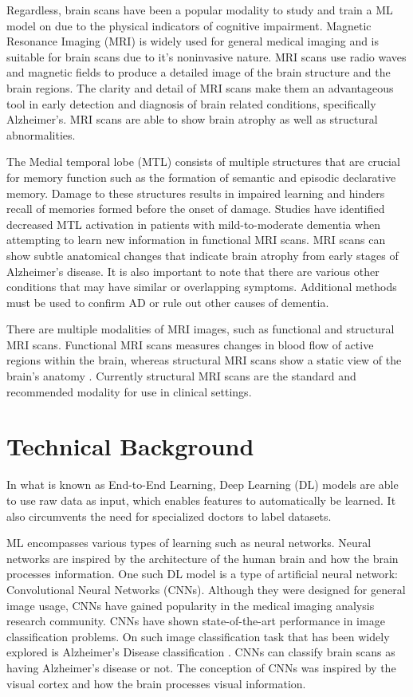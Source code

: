 \documentclass[10pt,twocolumn]{article}
\begin{document}
Regardless, brain scans have been a popular modality to study and train a ML model on due to the physical indicators of cognitive impairment. Magnetic Resonance Imaging (MRI) is widely used for general medical imaging and is suitable for brain scans due to it's noninvasive nature. MRI scans use radio waves and magnetic fields to produce a detailed image of the brain structure and the brain regions. The clarity and detail of MRI scans make them an advantageous tool in early detection and diagnosis of brain related conditions, specifically Alzheimer's. MRI scans are able to show brain atrophy as well as structural abnormalities\cite{chandra2019magnetic}.

The Medial temporal lobe (MTL) consists of multiple structures that are crucial for memory function such as the formation of semantic and episodic declarative memory. Damage to these structures results in impaired learning and hinders recall of memories formed before the onset of damage.\cite{bayley2006fate} Studies have identified decreased MTL activation in patients with mild-to-moderate dementia when attempting to learn new information in functional MRI scans. \cite{dickerson2004medial} MRI scans can show subtle anatomical changes that indicate brain atrophy from early stages of Alzheimer’s disease. It is also important to note that there are various other conditions that may have similar or overlapping symptoms. Additional methods must be used to confirm AD or rule out other causes of dementia.

There are multiple modalities of MRI images, such as functional and structural MRI scans. Functional MRI scans measures changes in blood flow of active regions within the brain, whereas structural MRI scans show a static view of the brain's anatomy \cite{symms2004review}. Currently structural MRI scans are the standard and recommended modality for use in clinical settings. \cite{chandra2019magnetic} 

\section{Technical Background}
In what is known as End-to-End Learning, Deep Learning (DL) models are able to use raw data as input, which enables features to automatically be learned. It also circumvents the need for specialized doctors to label datasets.

ML encompasses various types of learning such as neural networks. Neural networks are inspired by the architecture of the human brain and how the brain processes information. One such DL model is a type of artificial neural network: Convolutional Neural Networks (CNNs). Although they were designed for general image usage, CNNs have gained popularity in the medical imaging analysis research community. CNNs have shown state-of-the-art performance in image classification problems. On such image classification task that has been widely explored is Alzheimer's Disease classification \cite{yamashita2018convolutional}. CNNs can classify brain scans as having Alzheimer's disease or not. The conception of CNNs was inspired by the visual cortex and how the brain processes visual information.
\end{document}
